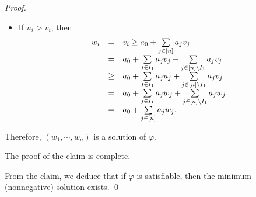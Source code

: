 \documentclass[runningheads]{llncs}
\begin{document}
\begin{proof}
\begin{itemize}
\item If $u_i > v_i$, then 
$$
\begin{array}{l c l}
w_i & = & v_i \ge a_{0} + \sum \limits_{j \in [n]} a_{j} v_j \\
& = & a_{0} + \sum \limits_{j \in I_1} a_{j} v_j + \sum \limits_{j \in [n] \setminus I_1} a_{j} v_j \\
& \ge & a_{0} + \sum \limits_{j \in I_1} a_{j} u_j + \sum \limits_{j \in [n] \setminus I_1} a_{j} v_j \\
& = & a_{0} + \sum \limits_{j \in I_1} a_{j} w_j + \sum \limits_{j \in [n] \setminus I_1} a_{j} w_j \\
& = & a_{0} + \sum \limits_{j \in [n]} a_{j} w_j. 
\end{array}
$$
\end{itemize}

Therefore, $(w_1, \cdots, w_n)$ is a solution of $\varphi$.

The proof of the claim is complete. 

From the claim, we deduce that if $\varphi$ is satisfiable, then the minimum (nonnegative) solution exists. 
\qed
\end{proof}
\end{document}
